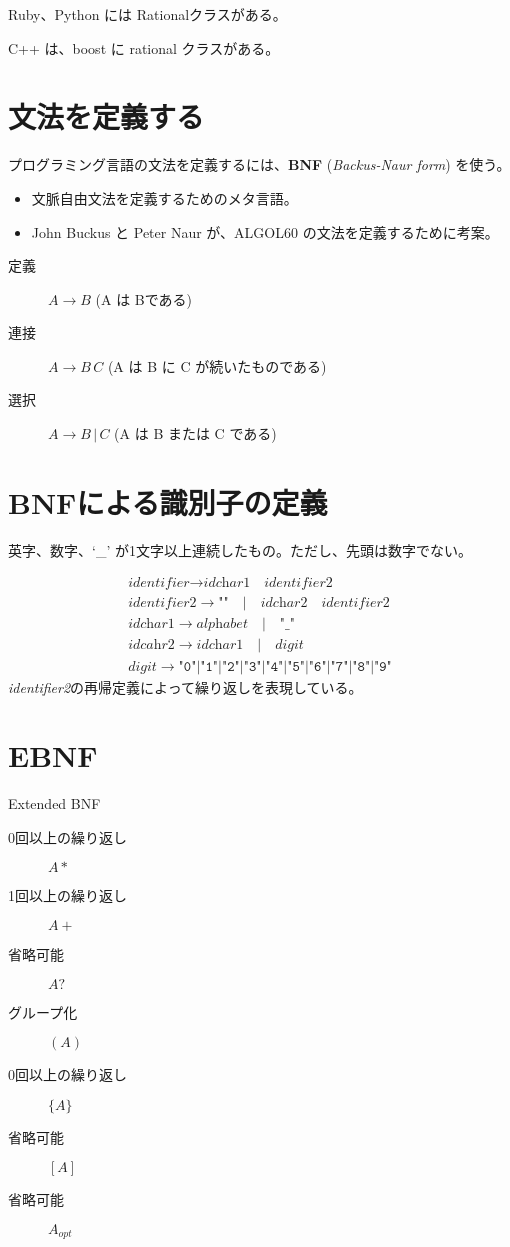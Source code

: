 \documentclass[slide,papersize,fleqn]{jsarticle}
\begin{document}
Ruby、Python には Rationalクラスがある。

C++ は、boost に rational クラスがある。

\section{文法を定義する}
\small
プログラミング言語の文法を定義するには、\textbf{BNF}
(\textsl{Backus-Naur form\/}) を使う。
\begin{itemize}
\item 文脈自由文法を定義するためのメタ言語。
\item John Buckus と Peter Naur が、ALGOL60 の文法を定義するために考案。
\end{itemize}
\begin{description}
\item[定義] $A \rightarrow B$  (A は Bである)
\item[連接] $A \rightarrow B\,C$ (A は B に C が続いたものである)
\item[選択] $A \rightarrow B\,|\,C$ (A は B または C である)
\end{description}

\section{BNFによる識別子の定義}
\begin{tcolorbox}[nobeforeafter]
  \tiny
英字、数字、`\_' が1文字以上連続したもの。ただし、先頭は数字でない。
\end{tcolorbox}
\newcommand{\OR}{\quad|\quad}%
\newcommand{\q}{\quad}%
\footnotesize
\begin{gather*}
\textit{identifier} \rightarrow \textit{idchar1}\quad
\textit{identifier2} \\
\textit{identifier2} \rightarrow \texttt{""}\OR\textit{idchar2}\quad
\textit{identifier2} \\
\textit{idchar1}\rightarrow\textit{alphabet}\OR\texttt{"\_"} \\
\textit{idcahr2}\rightarrow\textit{idchar1}\OR\textit{digit} \\
\textit{digit}\rightarrow\texttt{"0"}|\texttt{"1"}|\texttt{"2"}|\texttt{"3"}|\texttt{"4"}|\texttt{"5"}|\texttt{"6"}|\texttt{"7"}|\texttt{"8"}|\texttt{"9"}
\end{gather*}
\tiny\vfill
\textit{identifier2}の再帰定義によって繰り返しを表現している。
\normalsize
\section{EBNF}
Extended BNF
\begin{description}
\item[0回以上の繰り返し] $A*$
\item[1回以上の繰り返し] $A+$
\item[省略可能] $A?$
\item[グループ化] $(A)$
\item[0回以上の繰り返し] $\{A\}$
\item[省略可能] $[A]$
\item[省略可能] $A_{opt}$
\end{description}
\end{document}
